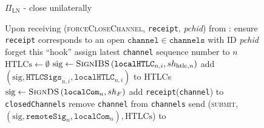   \begin{figure}[H]
    \begin{protocolbox}{$\Pi_{\mathrm{LN}}$ - close unilaterally}
      \begin{algorithmic}[1]
        \State Upon receiving (\textsc{forceCloseChannel}, \texttt{receipt},
        \textit{pchid}) from \environment:
        \Indent
          \State ensure \texttt{receipt} corresponds to an open
          $\mathtt{channel} \in \mathtt{channels}$ with ID \textit{pchid}
          \label{alg:protocol:close:unilateral:ensure}
            \State forget this ``hook''
          \EndIf
          \State assign latest \texttt{channel} sequence number to $n$
          \State $\mathrm{HTLCs} \gets \emptyset$
            \State $\mathrm{sig} \gets
            \textsc{SignIBS}\left(\mathtt{localHTLC}_{n, i}, sh_{\mathrm{htlc},
            n}\right)$
            \State add $\left(\mathrm{sig}, \mathtt{HTLCSigs}_{n, i},
            \mathtt{localHTLC}_{n, i}\right)$ to HTLCs
          \EndFor
          \State $\mathrm{sig} \gets \textsc{SignDS}\left(\mathtt{localCom}_n,
          sh_F\right)$
          \State add \texttt{receipt}(\texttt{channel}) to
          \texttt{closedChannels}
          \label{alg:protocol:close:unilateral:report}
          \State remove \texttt{channel} from \texttt{channels}
          \label{alg:protocol:close:unilateral:remove}
          \State send (\textsc{submit}, $\left(\mathrm{sig},
          \mathtt{remoteSig}_n, \mathtt{localCom}_n\right), \mathrm{HTLCs}$) to
          \ledger
          \label{alg:protocol:close:unilateral:submit}
        \EndIndent
      \end{algorithmic}
    \end{protocolbox}
    \caption{}
    \label{alg:protocol:close:unilateral}
  \end{figure}


